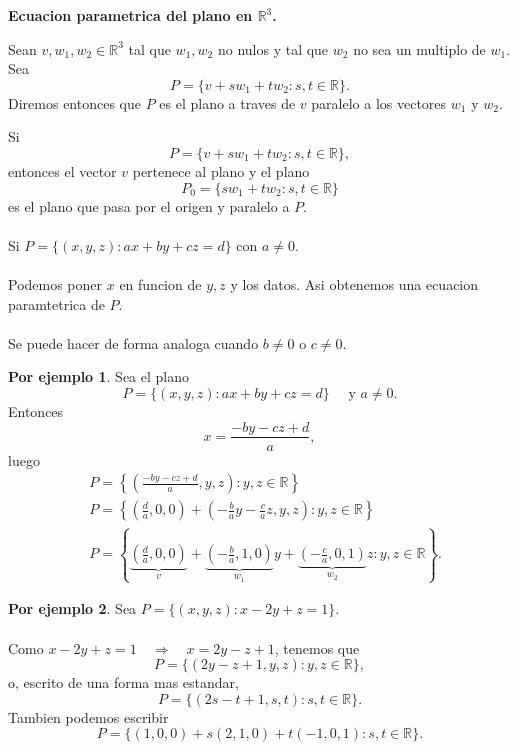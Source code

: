 \documentclass{article}
\theoremstyle{definition}
\theoremstyle{definition}
\newtheorem*{ej}{Por ejemplo}
\theoremstyle{remark}
\begin{document}
\begin{center}
  \textbf{Ecuacion parametrica del plano en $\mathbb{R}^3$.}
\end{center}
\begin{defi}
  Sean $v,w_1,w_2 \in \mathbb{R}^3$ tal que $w_1,w_2$ no nulos y tal que $w_2$ no sea un multiplo de $w_1$. Sea \[
    P = \{v+sw_1+tw_2  : s,t \in \mathbb{R}\}.
  \]
  Diremos entonces que $P$ es el plano a traves de $v$ paralelo a los vectores $w_1$ y $w_2$.
\end{defi}
Si \[
  P=\{v+sw_1+tw_2 : s,t \in \mathbb{R}\},
\]
entonces el vector $v$ pertenece al plano y el plano \[
  P_0 = \{sw_1+tw_2 : s,t \in \mathbb{R} \}
\]
es el plano que pasa por el origen y paralelo a $P$.
\\\\
Si $P=\big\{(x,y,z) : ax+by+cz=d\big\}$ con $a \neq 0$. \\\\ 
Podemos poner $x$ en funcion de $y,z$ y los datos. Asi obtenemos una ecuacion paramtetrica de $P$.\\\\
Se puede hacer de forma analoga cuando $b \neq 0$ o $c \neq 0$.
\begin{ej}
  Sea el plano  \[
    P=\big\{(x,y,z) : ax+by+cz = d\big\} \quad \text{ y } a \neq 0.
  \]
  Entonces \[
    x=\frac{-by-cz+d}{a},
  \]
  luego \[
    \begin{aligned}
    &P=\left\{\left(\frac{-by-cz+d}{a},y,z\right): y,z \in \mathbb{R}
    \right\}  \\
    &P=\left\{\left(\frac{d}{a},0,0\right)+\left(-\frac{b}{a}y-\frac{c}{a}z,y,z\right) : y,z \in \mathbb{R} \right\} \\
    &P=\left\{\underbrace{\left(\frac{d}{a},0,0\right)}_{v}+\underbrace{\left(-\frac{b}{a},1,0\right)}_{w_1}y+\underbrace{\left(-\frac{c}{a},0,1\right)}_{w_2}z : y,z \in \mathbb{R}\right\}.
    \end{aligned}
  \]
\end{ej}\pagebreak
\begin{ej}
  Sea $P=\big\{(x,y,z) : x-2y+z=1\big\}.$ \\\\
  Como $x-2y+z=1 \quad \Rightarrow \quad x=2y-z+1$, tenemos que \[
    P=\big\{(2y-z+1,y,z) : y,z \in \mathbb{R}\big\},
    \] o, escrito de una forma mas estandar, \[
    P=\big\{(2s-t+1,s,t) : s,t \in \mathbb{R} \big\}.
    \]Tambien podemos escribir \[
    P = \{(1,0,0)+s(2,1,0)+t(-1,0,1) : s,t \in \mathbb{R} \}.
  \]
\end{ej}
\end{document}
